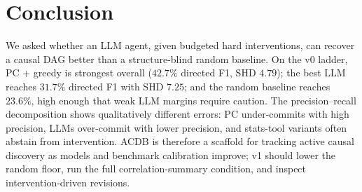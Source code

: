 \section{Conclusion}
\label{sec:conclusion}

We asked whether an LLM agent, given budgeted hard interventions, can recover a causal DAG better than a structure-blind random baseline. On the v0 ladder, PC + greedy is strongest overall ($42.7\%$ directed F1, SHD $4.79$); the best LLM reaches $31.7\%$ directed F1 with SHD $7.25$; and the random baseline reaches $23.6\%$, high enough that weak LLM margins require caution. The precision--recall decomposition shows qualitatively different errors: PC under-commits with high precision, LLMs over-commit with lower precision, and stats-tool variants often abstain from intervention. ACDB is therefore a scaffold for tracking active causal discovery as models and benchmark calibration improve; v1 should lower the random floor, run the full correlation-summary condition, and inspect intervention-driven revisions.
